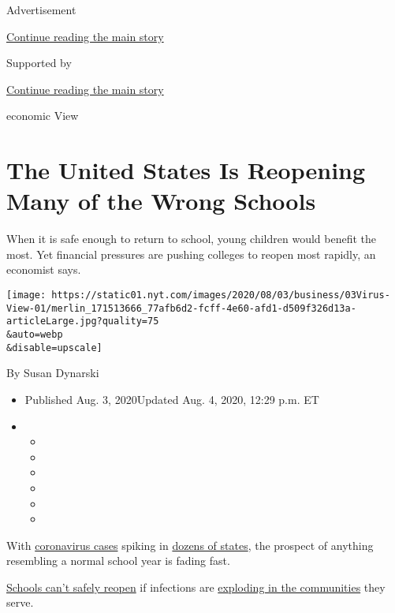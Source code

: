 Advertisement

\protect\hyperlink{after-top}{Continue reading the main story}

Supported by

\protect\hyperlink{after-sponsor}{Continue reading the main story}

economic View

\hypertarget{the-united-states-is-reopening-many-of-the-wrong-schools}{%
\section{The United States Is Reopening Many of the Wrong
Schools}\label{the-united-states-is-reopening-many-of-the-wrong-schools}}

When it is safe enough to return to school, young children would benefit
the most. Yet financial pressures are pushing colleges to reopen most
rapidly, an economist says.

\texttt{[image: https://static01.nyt.com/images/2020/08/03/business/03Virus-View-01/merlin\_171513666\_77afb6d2-fcff-4e60-afd1-d509f326d13a-articleLarge.jpg?quality=75\\\&auto=webp\\\&disable=upscale]}

By Susan Dynarski

\begin{itemize}
\item
  Published Aug. 3, 2020Updated Aug. 4, 2020, 12:29 p.m. ET
\item
  \begin{itemize}
  \item
  \item
  \item
  \item
  \item
  \item
  \end{itemize}
\end{itemize}

With \href{https://www.nytimes.com/news-event/coronavirus}{coronavirus
cases} spiking in
\href{https://www.nytimes.com/interactive/2020/07/09/us/coronavirus-cases-reopening-trends.html}{dozens
of states}, the prospect of anything resembling a normal school year is
fading fast.

\href{https://www.nytimes.com/2020/08/03/us/school-closing-coronavirus.html}{Schools
can't safely reopen} if infections are
\href{https://www.nytimes.com/interactive/2020/07/31/us/coronavirus-school-reopening-risk.html}{exploding
in the communities} they serve.

